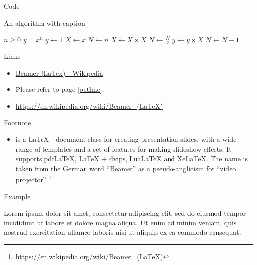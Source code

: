 \documentclass{beamer}
\begin{document}
\begin{frame}{Code}
    \begin{algorithm}[H]
        \caption{An algorithm with caption}
        \begin{algorithmic}
            \Require $n \geq 0$
            \Ensure $y = x^n$
            \State $y \gets 1$
            \State $X \gets x$
            \State $N \gets n$
                \State $X \gets X \times X$
                \State $N \gets \frac{N}{2}$  
                \State $y \gets y \times X$
                \State $N \gets N - 1$
            \EndIf
            \EndWhile
        \end{algorithmic}
    \end{algorithm}
\end{frame}

\begin{frame}{Links}
    \begin{itemize}
        \item \href{https://en.wikipedia.org/wiki/Beamer_(LaTeX)}{Beamer (LaTex) - Wikipedia}
        \item Please refer to page \ref{outline}.
        \item \url{https://en.wikipedia.org/wiki/Beamer_(LaTeX)}
    \end{itemize}
\end{frame}

\begin{frame}{Footnote}
    \begin{itemize}
        \item {}\cite{tantau2004user} is a \LaTeX~~document\cite{kopka2003guide} class for creating presentation slides, with a wide range of templates and a set of features for making slideshow effects. It supports pdfLaTeX, LaTeX + dvips, LuaLaTeX and XeLaTeX. The name is taken from the German word ``Beamer'' as a pseudo-anglicism for ``video projector''. \footnote{\href{https://en.wikipedia.org/wiki/Beamer_(LaTeX)}{https://en.wikipedia.org/wiki/Beamer\_(LaTeX)}}
    \end{itemize}
\end{frame}


\begin{frame}{Example}
    \begin{example}
        Lorem ipsum dolor sit amet, consectetur adipiscing elit, sed do eiusmod tempor incididunt ut labore et dolore magna aliqua. Ut enim ad minim veniam, quis nostrud exercitation ullamco laboris nisi ut aliquip ex ea commodo consequat.
    \end{example}
\end{frame}
\end{document}
